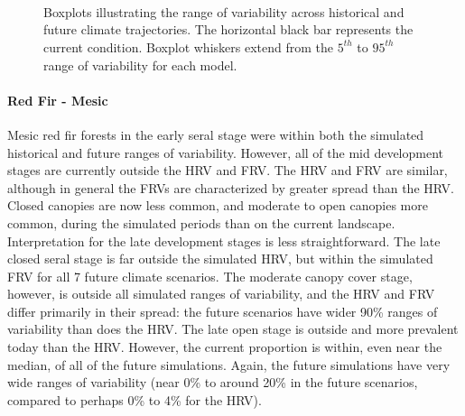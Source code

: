 \begin{figure}[htbp]
  \centering
   \\
   \\
       \\
    \caption{Boxplots illustrating the range of variability across historical and future climate trajectories. The horizontal black bar represents the current condition. Boxplot whiskers extend from the $5^{th}$ to $95^{th}$ range of variability for each model. }
  \label{fig:covcond_ocfw}
\end{figure} %

\paragraph{Red Fir - Mesic} Mesic red fir forests in the early seral stage were within both the simulated historical and future ranges of variability. However, all of the mid development stages are currently outside the HRV and FRV. The HRV and FRV are similar, although in general the FRVs are characterized by greater spread than the HRV. Closed canopies are now less common, and moderate to open canopies more common, during the simulated periods than on the current landscape. Interpretation for the late development stages is less straightforward. The late closed seral stage is far outside the simulated HRV, but within the simulated FRV for all 7 future climate scenarios. The moderate canopy cover stage, however, is outside all simulated ranges of variability, and the HRV and FRV differ primarily in their spread: the future scenarios have wider 90\% ranges of variability than does the HRV. The late open stage is outside and more prevalent today than the HRV. However, the current proportion is within, even near the median, of all of the future simulations. Again, the future simulations have very wide ranges of variability (near 0\% to around 20\% in the future scenarios, compared to perhaps 0\% to 4\% for the HRV). 

